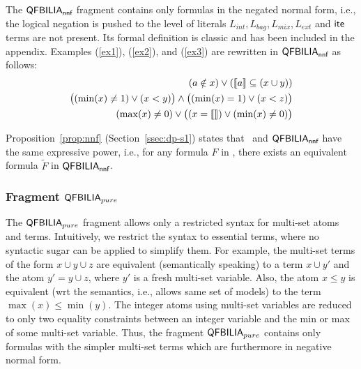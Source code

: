 The $\textsf{QFBILIA}_{\textsf{nnf}}$ fragment contains only formulas in the negated normal form, i.e., the logical negation is pushed to the level of literals $L_{int}, L_{bag}, L_{mix}, L_{ext}$ and $\textsf{ite}$ terms are not present.
Its formal definition is classic and has been included in the appendix.
%
Examples (\ref{ex1}), (\ref{ex2}), and (\ref{ex3}) are rewritten in $\textsf{QFBILIA}_{\textsf{nnf}}$ as follows:
\begin{eqnarray}
\label{ex2}
(a \notin x) \lor (\llbracket a \rrbracket \subseteq (x\cup y))
\label{ex1nnf}
\\
\big((\min(x) \neq 1) \lor (x<y)\big) \land \big((\min(x) = 1) \lor (x < z)\big)
\label{ex2nnf}
\\
(\max(x) \neq 0) \lor \big((x = \llbracket  \rrbracket) \lor (\min(x) \neq 0)\big)
\label{ex3nnf}
\end{eqnarray}


Proposition~\ref{prop:nnf} (Section~\ref{ssec:dp-s1}) states that \QFBILIA\ and $\textsf{QFBILIA}_{\textsf{nnf}}$ have the same expressive power, i.e., for any formula $F$ in \QFBILIA, there exists an equivalent formula $\tilde{F}$ in $\textsf{QFBILIA}_{\textsf{nnf}}$.


\subsubsection{Fragment $\textsf{QFBILIA}_{pure}$}
\label{sssec:pure}

The $\textsf{QFBILIA}_{pure}$ fragment allows only a restricted syntax for multi-set atoms and terms.
Intuitively, we restrict the syntax to essential terms, where no syntactic sugar can be applied to simplify them.
For example, the multi-set terms of the form $x\cup y \cup z$ are equivalent (semantically speaking)
to a term $x\cup y'$ and the atom $y'=y\cup z$, where $y'$ is a fresh multi-set variable.
Also, the atom $x\leq y$ is equivalent (wrt the semantics, i.e., allows same set of models) to the term $\max(x)\leq \min(y)$.
The integer atoms using multi-set variables are reduced to only two equality constraints between an integer variable and the min or max of some multi-set variable.
Thus, the fragment $\textsf{QFBILIA}_{pure}$ contains only formulas with the simpler multi-set terms which are furthermore in negative normal form.

